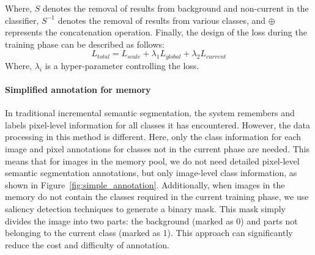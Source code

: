 Where, \(S\) denotes the removal of results from background and non-current in the classifier, \(S^{-1}\) denotes the removal of results from various classes, and \(\oplus\) represents the concatenation operation. Finally, the design of the loss during the training phase can be described as follows:
\[L_{total}=L_{scale}+\lambda_{1}L_{global}+\lambda_{2}L_{current}\]
Where, \(\lambda_{i}\) is a hyper-parameter controlling the loss.

\iffalse
\paragraph{Intra-head soft mask for output}
During the inference stage, a \(softmax\) operation is used within each classifier, in conjunction with a soft mask to process the semantic segmentation results, as illustrated in the bottom of Figure~\cref{fig:overview}. This approach further leverages non-current information within the classifier, and the soft mask enables decision-making without compromising the integrity of the original semantic outputs, effectively preventing classification errors. This can be described as follows:
\[M_t^c=Softmax(h_t^c)\]
\[h_{t_{(i,j)}}^{c}=\begin{cases}\lambda_{mask}\cdot class~t~~~~where~ M_{t_{(i,j)}}^{c}=non\_current\\class~t~~~~~~~~~~~~~~~~~where~M_{t_{(i,j)}}^{c}=class~t\\bg~~~~~~~~~~~~~~~~~~~~~~~~~where~ M_{t_{(i,j)}}^{c}=bg\end{cases}\]

Where,  \(h_t^c\) represents the output results from the classification head, \(M_t^c\) denotes the integrated information after applying a \(softmax\) operation to  \(h_t^c\), and \(\lambda_{mask}\) represents the soft mask coefficient.
\fi

\paragraph{Simplified annotation for memory}
In traditional incremental semantic segmentation, the system remembers and labels pixel-level information for all classes it has encountered. However, the data processing in this method is different. Here, only the class information for each image and pixel annotations for classes not in the current phase are needed. This means that for images in the memory pool, we do not need detailed pixel-level semantic segmentation annotations, but only image-level class information, as shown in Figure~\cref{fig:simple_annotation}.
Additionally, when images in the memory do not contain the classes required in the current training phase, we use saliency detection techniques to generate a binary mask. This mask simply divides the image into two parts: the background (marked as 0) and parts not belonging to the current class (marked as 1). This approach can significantly reduce the cost and difficulty of annotation.

